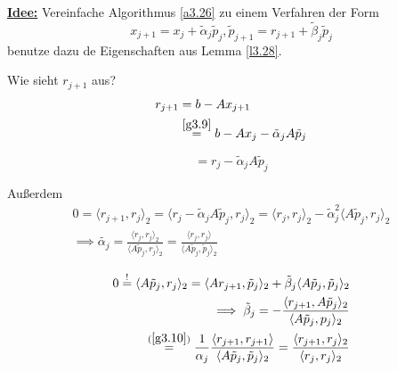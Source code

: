 \documentclass{book}
\begin{document}
            \underline{\textbf{Idee:}} Vereinfache Algorithmus \ref{a3.26} zu einem Verfahren der Form
            \begin{equation}\label{g3.9} %
                x_{j+1}=x_j+\tilde{\alpha}_j\tilde{p}_j, \tilde{p}_{j+1}=r_{j+1}+\tilde{\beta}_j\tilde{p}_j    
            \end{equation}
            benutze dazu de Eigenschaften aus Lemma \ref{l3.28}.
            
            Wie sieht $r_{j+1}$ aus?
            \begin{align*}
                r_{j+1}&=b-Ax_{j+1}\\   
                &\stackrel{\ref{g3.9}}{=} b-Ax_j-\tilde{\alpha}_j A  \tilde{p}_j
            \end{align*}

            \begin{equation}\label{g3.10}
                =r_j-\tilde{\alpha}_j A  \tilde{p}_j
            \end{equation}

            Außerdem \begin{align*} 
                0=\langle r_{j+1},r_j \rangle_2 = \langle r_j-\tilde{\alpha}_j A  \tilde{p}_j,r_j \rangle_2 = \langle r_j,r_j \rangle_2-\tilde{\alpha}_j^2 \langle A\tilde{p}_j,r_j \rangle_2
                \\ \implies \tilde{\alpha_j}=\frac{\langle r_j,r_j \rangle_2}{\langle A\tilde{p}_j,r_j \rangle_2}=\frac{\langle r_j,r_j \rangle}{\langle A\tilde{p}_j,\tilde{p}_j \rangle_2}
            \end{align*}

            \begin{align*}
                0\stackrel{!}{=}\langle A\tilde{p}_j,r_j \rangle_2 = \langle Ar_{j+1},\tilde{p}_j \rangle_2 +\tilde{\beta}_j \langle A\tilde{p}_j, \tilde{p}_j\rangle_2\\
                \implies \tilde{\beta}_j=-\frac{\langle r_{j+1},A\tilde{p}_j \rangle_2}{\langle A\tilde{p}_j,p_j \rangle_2}\\
                \stackrel{(\ref{g3.10})}{=}\frac{1}{\alpha_j} \frac{\langle r_{j+1}, r_{j+1}\rangle}{\langle A\tilde{p}_j,\tilde{p}_j \rangle_2}=\frac{\langle r_{j+1},r_j \rangle_2}{\langle r_j,r_j \rangle_2}
            \end{align*}
                
\end{document}
